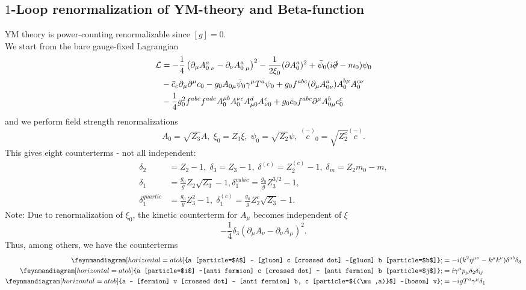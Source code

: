 \subsection{$1$-Loop renormalization of YM-theory and Beta-function}
YM theory is power-counting renormalizable since $[g]=0$.\\
We start from the bare gauge-fixed Lagrangian
\begin{align*}
	\mathcal{L} &= - \frac{1}{4} \left(\partial_\mu A^a_{0\;\nu} - \partial_\nu A^a_{0 \; \mu} \right)^2 - \frac{1}{2 \xi_0} (\partial A^a_0)^2 + \bar{\psi}_0 (i \slashed{\partial} - m_0) \psi_0 \\
	& - \bar{c}_c \partial_\mu \partial^\mu c_0 - g_0 A_{0\mu} \bar{\psi}_0 \gamma^\mu T^a \psi_0 + g_0 f^{abc} (\partial_\mu A^a_{0\nu}) A^{b\mu}_0 A^{c \nu}_0 \\
	&-\frac{1}{4} g^2_0 f^{abc} f^{ade} A^{\mu b}_0 A^{\nu c}_0 A^d_{\mu 0} A^e_{\nu 0} + g_0 \bar{c}_0 f^{abc} \partial^\mu A^b_{0 \mu} c^c_0
\end{align*}
and we perform field strength renormalizations
\begin{equation}
	A_0 = \sqrt{Z_3}A, \; \xi_0=Z_3 \xi, \; \psi_0= \sqrt{Z_2}\psi, \; \stackrel{(-)}{c}_0 = \sqrt{Z^c_2} \stackrel{(-)}{c}.
\end{equation}
This gives eight counterterms - not all independent:
\begin{align*}
	\delta_2 &=Z_2 -1, \; \delta_3 = Z_3-1, \; \delta^{(c)} = Z^{(c)}_2 -1, \; \delta_m = Z_2 m_0 -m,\\
	 \delta_1 &= \frac{g_0}{g} Z_2 \sqrt{Z_3}-1, \delta^{cubic}_1 = \frac{g_0}{g} Z^{3/2}_3-1,\\
	  \delta^{quartic}_1 &= \frac{g_0}{g}Z^2_3-1, \; \delta^{(c)}_1 = \frac{g_0}{g} Z^c_2 \sqrt{Z_3}-1.
\end{align*}
Note: Due to renormalization of $\xi_0$, the kinetic counterterm for $A_\mu$ becomes independent of $\xi$
\begin{equation*}
	-\frac{1}{4} \delta_3 ( \partial_\mu A_\nu - \partial_\nu A_\mu)^2.
\end{equation*}
Thus, among others, we have the counterterms
\begin{align}
	\feynmandiagram[horizontal=a to b]{a [particle=$A$] -- [gluon] c [crossed dot] --[gluon] b [particle=$b$]};
	&= -i (k^2 \eta^{\mu \nu} - k^\mu k^\nu) \delta^{ab} \delta_3 \\
	\feynmandiagram[horizontal=a to b]{a [particle=$i$] --[anti fermion] c [crossed dot] -- [anti fermion] b [particle=$j$]};
	&= i \gamma^\mu p_\mu \delta_2 \delta_{ij} \\
	\feynmandiagram[horizontal=a to b]{a -- [fermion] v [crossed dot] -- [anti fermion] b, c [particle=${(\mu,a)}$] --[boson] v};
	&= -ig T^a \gamma^\mu \delta_1
\end{align}
